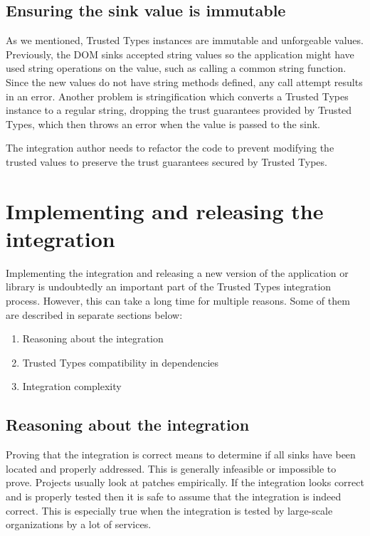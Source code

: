 \subsection{Ensuring the sink value is immutable}
\label{tt_integration_ensure_tt_not_altered}

As we mentioned, Trusted Types instances are immutable and unforgeable values. Previously, the DOM
sinks accepted string values so the application might have used string operations on the value, such
as calling a common string function. Since the new values do not have string methods defined, any
call attempt results in an error. Another problem is stringification which converts a Trusted Types
instance to a regular string, dropping the trust guarantees provided by Trusted Types, which then
throws an error when the value is passed to the sink.

The integration author needs to refactor the code to prevent modifying the trusted values to
preserve the trust guarantees secured by Trusted Types.

\section{Implementing and releasing the integration}

Implementing the integration and releasing a new version of the application or library is
undoubtedly an important part of the Trusted Types integration process. However, this can take a
long time for multiple reasons. Some of them are described in separate sections below:

\begin{enumerate}
  \item Reasoning about the integration
  \item Trusted Types compatibility in dependencies
  \item Integration complexity
\end{enumerate}

\subsection{Reasoning about the integration}
\label{sub:reason_about_integration}

Proving that the integration is correct means to determine if all sinks have been located and
properly addressed. This is generally infeasible or impossible to prove. Projects usually look at
patches empirically. If the integration looks correct and is properly tested then it is safe to
assume that the integration is indeed correct. This is especially true when the integration is
tested by large-scale organizations by a lot of services.

